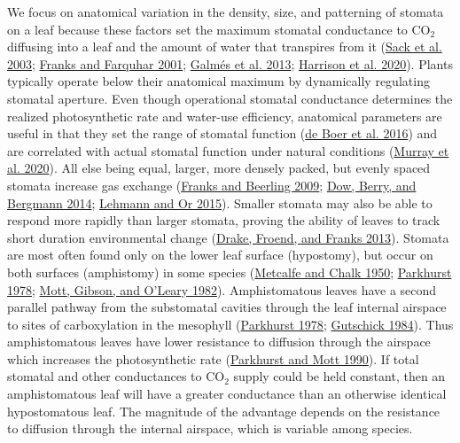 \documentclass[
  12pt,
]{article}
\begin{document}
We focus on anatomical variation in the density, size, and patterning of stomata on a leaf because these factors set the maximum stomatal conductance to CO\(_2\) diffusing into a leaf and the amount of water that transpires from it (\protect\hyperlink{ref-sack_hydrology_2003}{Sack et al. 2003}; \protect\hyperlink{ref-franks_effect_2001}{Franks and Farquhar 2001}; \protect\hyperlink{ref-galmes_leaf_2013}{Galmés et al. 2013}; \protect\hyperlink{ref-harrison_influence_2020}{Harrison et al. 2020}). Plants typically operate below their anatomical maximum by dynamically regulating stomatal aperture. Even though operational stomatal conductance determines the realized photosynthetic rate and water-use efficiency, anatomical parameters are useful in that they set the range of stomatal function (\protect\hyperlink{ref-de_boer_optimal_2016}{de Boer et al. 2016}) and are correlated with actual stomatal function under natural conditions (\protect\hyperlink{ref-murray_consistent_2020}{Murray et al. 2020}). All else being equal, larger, more densely packed, but evenly spaced stomata increase gas exchange (\protect\hyperlink{ref-franks_maximum_2009}{Franks and Beerling 2009}; \protect\hyperlink{ref-dow_physiological_2014}{Dow, Berry, and Bergmann 2014}; \protect\hyperlink{ref-lehmann_effects_2015}{Lehmann and Or 2015}). Smaller stomata may also be able to respond more rapidly than larger stomata, proving the ability of leaves to track short duration environmental change (\protect\hyperlink{ref-drake_smaller_2013}{Drake, Froend, and Franks 2013}). Stomata are most often found only on the lower leaf surface (hypostomy), but occur on both surfaces (amphistomy) in some species (\protect\hyperlink{ref-metcalfe_anatomy_1950}{Metcalfe and Chalk 1950}; \protect\hyperlink{ref-parkhurst_adaptive_1978}{Parkhurst 1978}; \protect\hyperlink{ref-mott_adaptive_1982}{Mott, Gibson, and O'Leary 1982}). Amphistomatous leaves have a second parallel pathway from the substomatal cavities through the leaf internal airspace to sites of carboxylation in the mesophyll (\protect\hyperlink{ref-parkhurst_adaptive_1978}{Parkhurst 1978}; \protect\hyperlink{ref-gutschick_photosynthesis_1984}{Gutschick 1984}). Thus amphistomatous leaves have lower resistance to diffusion through the airspace which increases the photosynthetic rate (\protect\hyperlink{ref-parkhurst_intercellular_1990}{Parkhurst and Mott 1990}). If total stomatal and other conductances to CO\(_2\) supply could be held constant, then an amphistomatous leaf will have a greater conductance than an otherwise identical hypostomatous leaf. The magnitude of the advantage depends on the resistance to diffusion through the internal airspace, which is variable among species.
\end{document}
